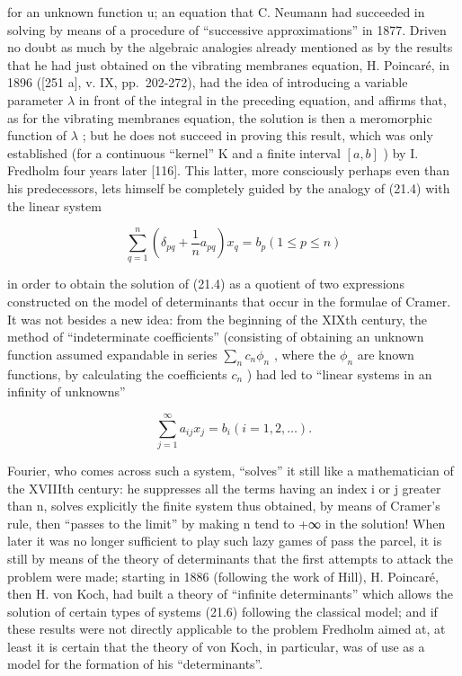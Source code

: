 for an unknown function u; an equation that C. Neumann had succeeded in solving by means of a procedure of ``successive approximations'' in 1877. Driven no doubt as much by the algebraic analogies already mentioned as by the results that he had just obtained on the vibrating membranes equation, H. Poincaré, in 1896 ({[}251 a{]}, v. IX, pp.~202-272), had the idea of introducing a variable parameter \(\lambda\) in front of the integral in the preceding equation, and affirms that, as for the vibrating membranes equation, the solution is then a meromorphic function of \(\lambda\) ; but he does not succeed in proving this result, which was only established (for a continuous ``kernel'' K and a finite interval \([a, b]\) ) by I. Fredholm four years later {[}116{]}. This latter, more consciously perhaps even than his predecessors, lets himself be completely guided by the analogy of (21.4) with the linear system

\[
\sum_ {q = 1} ^ {n} \left(\delta_ {p q} + \frac {1}{n} a _ {p q}\right) x _ {q} = b _ {p} (1 \leq p \leq n)\tag{21.5}
\]

in order to obtain the solution of (21.4) as a quotient of two expressions constructed on the model of determinants that occur in the formulae of Cramer. It was not besides a new idea: from the beginning of the XIXth century, the method of ``indeterminate coefficients'' (consisting of obtaining an unknown function assumed expandable in series \(\sum_{n} c_{n} \phi_{n}\) , where the \(\phi_{n}\) are known functions, by calculating the coefficients \(c_{n}\) ) had led to ``linear systems in an infinity of unknowns''

\[
\sum_ {j = 1} ^ {\infty} a _ {i j} x _ {j} = b _ {i} (i = 1, 2, \dots).\tag{21.6}
\]

Fourier, who comes across such a system, ``solves'' it still like a mathematician of the XVIIIth century: he suppresses all the terms having an index i or j greater than n, solves explicitly the finite system thus obtained, by means of Cramer's rule, then ``passes to the limit'' by making n tend to +∞ in the solution! When later it was no longer sufficient to play such lazy games of pass the parcel, it is still by means of the theory of determinants that the first attempts to attack the problem were made; starting in 1886 (following the work of Hill), H. Poincaré, then H. von Koch, had built a theory of ``infinite determinants'' which allows the solution of certain types of systems (21.6) following the classical model; and if these results were not directly applicable to the problem Fredholm aimed at, at least it is certain that the theory of von Koch, in particular, was of use as a model for the formation of his ``determinants''.

